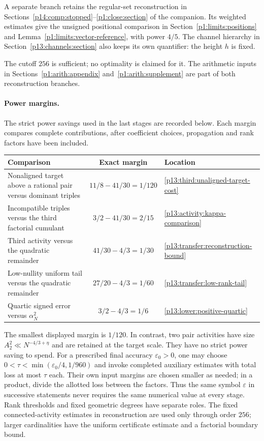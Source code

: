 A separate branch retains the regular-set reconstruction in
Sections~\ref{p14:comp:stopped}--\ref{p1:close:section} of the
companion. Its weighted estimates give the unsigned positional
comparison in Section~\ref{p1:limits:positions} and
Lemma~\ref{p1:limits:vector-reference}, with power \(4/5\).
The channel hierarchy in Section~\ref{p13:channels:section}
also keeps its own quantifier: the height \(h\) is fixed.

The cutoff \(256\) is sufficient; no optimality is claimed for it.
The arithmetic inputs in Sections~\ref{p1:arith:appendix}
and~\ref{p1:arith:supplement} are part of both reconstruction branches.

\paragraph{Power margins.}
The strict power savings used in the last stages are recorded below.
Each margin compares complete contributions, after coefficient choices,
propagation and rank factors have been included.
\begin{center}
\small
\begin{tabularx}{\textwidth}{@{}Xcl@{}}
\toprule
Comparison & Exact margin & Location\\
\midrule
Nonaligned target above a rational pair versus dominant triples
& $11/8-41/30=1/120$
& \eqref{p13:third:unaligned-target-cost}\\[4pt]
Incompatible triples versus the third factorial cumulant
& $3/2-41/30=2/15$
& \eqref{p13:activity:kappa-comparison}\\[4pt]
Third activity versus the quadratic remainder
& $41/30-4/3=1/30$
& \eqref{p13:transfer:reconstruction-bound}\\[4pt]
Low-nullity uniform tail versus the quadratic remainder
& $27/20-4/3=1/60$
& \eqref{p13:transfer:low-rank-tail}\\[4pt]
Quartic signed error versus $\alpha_N^2$
& $3/2-4/3=1/6$
& \eqref{p13:lower:positive-quartic}\\
\bottomrule
\end{tabularx}
\end{center}
The smallest displayed margin is $1/120$. In contrast, two pair
activities have size $A_2^2\ll N^{-4/3+\eta}$ and are retained at
the target scale. They have no strict power saving to spend.
For a prescribed final accuracy $\varepsilon_0>0$, one may choose
$0<\tau<\min(\varepsilon_0/4,1/960)$ and invoke completed auxiliary
estimates with total loss at most $\tau$ each. Their own input margins
are chosen smaller as needed; in a product, divide the allotted loss
between the factors. Thus the same symbol $\varepsilon$ in successive
statements never requires the same numerical value at every stage.
Rank thresholds and fixed geometric degrees have separate roles.
The fixed connected-activity estimates in reconstruction are used only
through order $256$; larger cardinalities have the uniform certificate estimate and a factorial
boundary bound.

